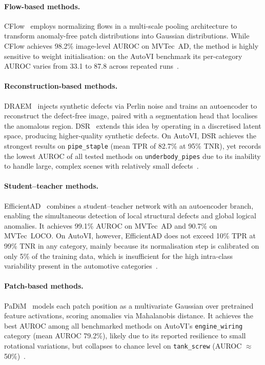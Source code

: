 \documentclass{article}
\begin{document}
\paragraph{Flow-based methods.}
CFlow~\cite{Gudovskiy2022} employs normalizing flows in a multi-scale
pooling architecture to transform anomaly-free patch distributions into
Gaussian distributions. While CFlow achieves 98.2\% image-level AUROC on
MVTec~AD, the method is highly sensitive to weight initialisation: on the
AutoVI benchmark its per-category AUROC varies from 33.1 to 87.8 across
repeated runs~\citep{Carvalho2024AutoVI}.

\paragraph{Reconstruction-based methods.}
DRAEM~\cite{Zavrtanik2021} injects synthetic defects via Perlin noise
and trains an autoencoder to reconstruct the defect-free image, paired
with a segmentation head that localises the anomalous region.
DSR~\cite{Zavrtanik2022} extends this idea by operating in a discretised
latent space, producing higher-quality synthetic defects. On AutoVI, DSR
achieves the strongest results on \texttt{pipe\_staple} (mean TPR of
82.7\% at 95\% TNR), yet records the lowest AUROC of all tested methods on
\texttt{underbody\_pipes} due to its inability to handle large, complex
scenes with relatively small defects~\citep{Carvalho2024AutoVI}.

\paragraph{Student--teacher methods.}
EfficientAD~\cite{Batzner2024} combines a student--teacher network with
an autoencoder branch, enabling the simultaneous detection of local
structural defects and global logical anomalies. It achieves 99.1\% AUROC
on MVTec~AD and 90.7\% on MVTec~LOCO. On AutoVI, however, EfficientAD
does not exceed 10\% TPR at 99\% TNR in any category, mainly because its
normalisation step is calibrated on only 5\% of the training data, which is
insufficient for the high intra-class variability present in the
automotive categories~\citep{Carvalho2024AutoVI}.

\paragraph{Patch-based methods.}
PaDiM~\cite{Defard2021} models each patch position as a multivariate
Gaussian over pretrained feature activations, scoring anomalies via
Mahalanobis distance. It achieves the best AUROC among all benchmarked methods on AutoVI's
\texttt{engine\_wiring} category (mean AUROC 79.2\%), likely due to
its reported resilience to small rotational variations, but collapses to
chance level on \texttt{tank\_screw} (AUROC ${\approx}$50\%)~\citep{Carvalho2024AutoVI}.
\end{document}
